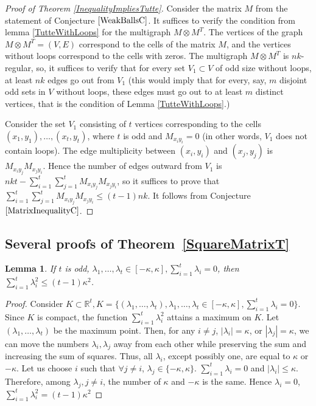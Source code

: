 \documentclass[12pt]{article}
\newtheorem{lemma}{Lemma}[section]
\theoremstyle{definition}
\theoremstyle{plain}
\renewcommand{\leq}{\leqslant}
\begin{document}
\begin {proof}[Proof of Theorem \ref{InequalityImpliesTutte}]
 Consider the matrix $M$ from the statement of Conjecture $\ref{WeakBallsC}$. It suffices to verify the condition from lemma \ref{TutteWithLoops} for the multigraph $M \otimes M^T$. The vertices of the graph $M \otimes M^T=(V,E)$ correspond to the cells of the matrix $M$, and the vertices without loops correspond to the cells with zeros. The multigraph $M \otimes M^T$ is $nk$-regular, so, it suffices to verify that for every set $V_1\subset V$
of odd size without loops,
at least $nk$ edges go out from $V_1$ (this would imply
that for every, say, $m$ disjoint odd sets in $V$ without loops,
these edges must go out to at least $m$ distinct vertices, that is the condition of Lemma \ref{TutteWithLoops}.) 

Consider the set $V_1$ consisting of $t$ vertices corresponding to the cells $(x_1, y_1), \dots , (x_t, y_t)$, where $t$ is odd and $M_{x_i y_i} = 0$
(in other words, $V_1$ does not contain loops). The edge multiplicity between $(x_i,y_i)$ and $(x_j,y_j)$ is $M_{x_i y_j}M_{x_j y_i}$. Hence the number of edges outward from $V_1$ is $nkt - \sum_{i=1}^{t} \sum_{j=1}^t M_{x_i y_j} M_{x_j y_i}$, so it suffices to prove that $\sum_{i=1}^{t} \sum_{j=1}^t M_{x_i y_j} M_{x_j y_i} \leq (t-1)nk$. It follows from Conjecture $\ref{MatrixInequalityC}$.
\end {proof}

\subsection{Several proofs of Theorem~\ref{SquareMatrixT}}

\begin{lemma}\label{LambdasSum0}
If $t$ is odd, $\lambda_1, \dots ,\lambda_t \in [-\kappa, \kappa], \sum_{i=1}^t \lambda_i = 0$, then $\sum_{i=1}^t \lambda_i^2 \leq (t-1)\kappa^2$.
\end{lemma}

\begin{proof}
Consider $K \subset \mathbb{R}^t, K = \{ (\lambda_1, \dots, \lambda_t), \lambda_1, \dots ,\lambda_t \in [-\kappa, \kappa], \sum_{i=1}^t \lambda_i = 0 \}$. Since $K$ is compact, the function $\sum_{i=1}^t \lambda_i^2$ attains a maximum on $K$. Let $(\lambda_1, \dots, \lambda_t)$ be the maximum point. Then, for any $i \neq j$, $|\lambda_i| = \kappa$, or $|\lambda_j| = \kappa$, we can move 
the numbers $\lambda_i,\lambda_j$ away from each other while preserving the sum and increasing the sum of squares. Thus, all $\lambda_i$, except possibly one, are equal to $\kappa$ or $-\kappa$. Let us choose $i$ such that $\forall j \neq i$, $\lambda_j \in \{-\kappa, \kappa \}$. $\sum_{i=1}^t \lambda_i = 0$ and $|\lambda_i| \leq \kappa$. Therefore, among $\lambda_j, j \neq i$, the number of $\kappa$ and $-\kappa$ is the same. Hence $\lambda_i = 0$, $\sum_{i=1}^t \lambda_i^2 = (t-1)\kappa^2$
\end {proof}
\end{document}
